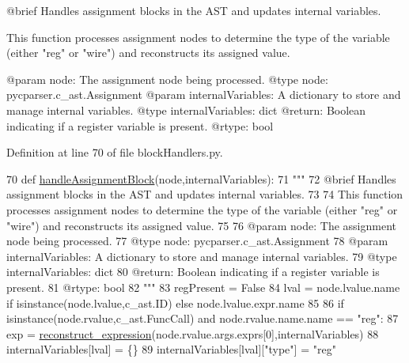 \begin{DoxyVerb}@brief Handles assignment blocks in the AST and updates internal variables.

This function processes assignment nodes to determine the type of the variable (either "reg" or "wire") and reconstructs its assigned value.

@param node: The assignment node being processed.
@type node: pycparser.c_ast.Assignment
@param internalVariables: A dictionary to store and manage internal variables.
@type internalVariables: dict
@return: Boolean indicating if a register variable is present.
@rtype: bool
\end{DoxyVerb}
 

Definition at line 70 of file block\+Handlers.\+py.


\begin{DoxyCode}
70 \textcolor{keyword}{def }\hyperlink{namespaceblockHandlers_ac54cbd08eb8b12eed0c801fa775911dd}{handleAssignmentBlock}(node,internalVariables):
71     \textcolor{stringliteral}{"""
}
72 \textcolor{stringliteral}{    @brief Handles assignment blocks in the AST and updates internal variables.
}
73 \textcolor{stringliteral}{
}
74 \textcolor{stringliteral}{    This function processes assignment nodes to determine the type of the variable (either "reg" or "wire")
       and reconstructs its assigned value.
}
75 \textcolor{stringliteral}{
}
76 \textcolor{stringliteral}{    @param node: The assignment node being processed.
}
77 \textcolor{stringliteral}{    @type node: pycparser.c\_ast.Assignment
}
78 \textcolor{stringliteral}{    @param internalVariables: A dictionary to store and manage internal variables.
}
79 \textcolor{stringliteral}{    @type internalVariables: dict
}
80 \textcolor{stringliteral}{    @return: Boolean indicating if a register variable is present.
}
81 \textcolor{stringliteral}{    @rtype: bool
}
82 \textcolor{stringliteral}{    """}
83     regPresent = \textcolor{keyword}{False}
84     lval = node.lvalue.name \textcolor{keywordflow}{if} isinstance(node.lvalue,c\_ast.ID) \textcolor{keywordflow}{else} node.lvalue.expr.name
85     
86     \textcolor{keywordflow}{if} isinstance(node.rvalue,c\_ast.FuncCall) \textcolor{keywordflow}{and} node.rvalue.name.name == \textcolor{stringliteral}{"reg"}:
87         exp = \hyperlink{namespaceblockHandlers_a5dcb5985c58176982a44686f616daa7f}{reconstruct\_expression}(node.rvalue.args.exprs[0],internalVariables)
88         internalVariables[lval] = \{\}
89         internalVariables[lval][\textcolor{stringliteral}{"type"}] = \textcolor{stringliteral}{"reg"}

\end{DoxyCode}
